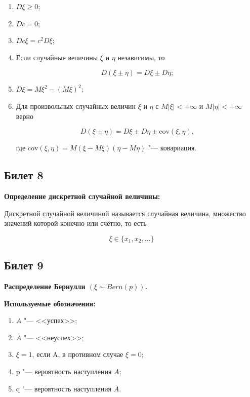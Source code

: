 \begin{enumerate}
    \item{$D\xi \geq 0$;}
    \item{$Dc = 0$;}
    \item{$Dc\xi = c^2 D\xi$;}
    \item{Если случайные величины $\xi$ и $\eta$ независимы, то
    
    \[
        D(\xi \pm \eta) = D\xi \pm D\eta;
    \]
    }
    \item{$D\xi = M\xi^{2} - (M\xi)^2$;}
    \item{Для произвольных случайных величин $\xi$ и $\eta$ с
    $M|\xi| < + \infty$ и $M|\eta| < + \infty$ верно
    
    \[
        D(\xi \pm \eta) = D\xi \pm D\eta \pm {\text{cov}(\xi, \eta)},
    \]

    где ${\text{cov}(\xi, \eta)} = M(\xi - M\xi)(\eta - M\eta)$ "--- ковариация.
    }
\end{enumerate}

\subsection{Билет 8}        

\textbf{Определение дискретной случайной величины:}
\smallskip

Дискретной случайной величиной называется случайная величина,
множество значений которой конечно или счётно, то есть

\[
    \xi \in \{x_1, x_2, \dots\}  
\]

\subsection{Билет 9}

\textbf{Распределение Бернулли $(\xi \sim Bern(p))$.}
\bigskip

\textbf{Используемые обозначения:}
\smallskip

\begin{enumerate}
    \item{$A$ "--- <<успех>>;}
    \item{$\overline{A}$ "--- <<неуспех>>;}
    \item{$\xi = 1$, если A, в противном случае $\xi = 0$;}
    \item{p "--- вероятность наступления $A$;}
    \item{q "--- вероятность наступления $\overline{A}$.}
\end{enumerate}
\bigskip

